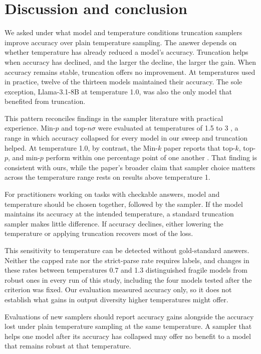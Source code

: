 \documentclass[11pt]{article}
\begin{document}
\section{Discussion and conclusion}
\label{sec:discussion}

We asked under what model and temperature conditions truncation samplers improve accuracy over
plain temperature sampling. The answer depends on whether temperature has already reduced a
model's accuracy. Truncation helps when accuracy has declined, and the larger the decline, the
larger the gain. When accuracy remains stable, truncation offers no improvement. At
temperatures used in practice, twelve of the thirteen models maintained their accuracy. The
sole exception, Llama-3.1-8B at temperature 1.0, was also the only model that benefited from
truncation.

This pattern reconciles findings in the sampler literature with practical experience. Min-$p$
and top-$n\sigma$ were evaluated at temperatures of 1.5 to 3
\citep{nguyen2024minp,tang2024topn}, a range in which accuracy collapsed for every model in our
sweep and truncation helped. At temperature 1.0, by contrast, the Min-$k$ paper reports that
top-$k$, top-$p$, and min-$p$ perform within one percentage point of one another
\citep{ding2026mink}. That finding is consistent with ours, while the paper's broader claim
that sampler choice matters across the temperature range rests on results above temperature 1.

For practitioners working on tasks with checkable answers, model and temperature should be
chosen together, followed by the sampler. If the model maintains its accuracy at the intended
temperature, a standard truncation sampler makes little difference. If accuracy declines,
either lowering the temperature or applying truncation recovers most of the loss.

This sensitivity to temperature can be detected without gold-standard answers. Neither the
capped rate nor the strict-parse rate requires labels, and changes in these rates between
temperatures 0.7 and 1.3 distinguished fragile models from robust ones in every run of this
study, including the four models tested after the criterion was fixed. Our evaluation measured
accuracy only, so it does not establish what gains in output diversity higher temperatures
might offer.

Evaluations of new samplers should report accuracy gains alongside the accuracy lost under
plain temperature sampling at the same temperature. A sampler that helps one model after its
accuracy has collapsed may offer no benefit to a model that remains robust at that temperature.
\end{document}
